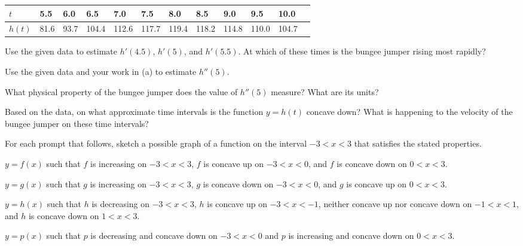\begin{exercises}
\begin{tabular}{| l || l | l | l |  l | l | l | l | l | l | l | l |}
\hline
$t$ & 5.5 & 6.0 & 6.5 & 7.0 & 7.5 & 8.0 & 8.5 & 9.0 & 9.5 & 10.0 \\ \hline \hline
$h(t)$ & 81.6 & 93.7 &  104.4 &  112.6 &  117.7 & 119.4 & 118.2 & 114.8 &  110.0 &  104.7
\\ \hline
\end{tabular}

\ba
	\item Use the given data to estimate $h'(4.5)$, $h'(5)$, and $h'(5.5)$.  At which of these times is the bungee jumper rising most rapidly?
	\item Use the given data and your work in (a) to estimate $h''(5)$.
	\item What physical property of the bungee jumper does the value of $h''(5)$ measure?  What are its units?
	\item Based on the data, on what approximate time intervals is the function $y = h(t)$ concave down?  What is happening to the velocity of the bungee jumper on these time intervals?
\ea

\item For each prompt that follows, sketch a possible graph of a function on the interval $-3 < x < 3$ that satisfies the stated properties.
\ba
	\item $y = f(x)$ such that $f$ is increasing on $-3 < x < 3$, $f$ is concave up on $-3 < x < 0$, and $f$ is concave down on $0 < x < 3$.
	\item $y = g(x)$ such that $g$ is increasing on $-3 < x < 3$, $g$ is concave down on $-3 < x < 0$, and $g$ is concave up on $0 < x < 3$.
	\item $y = h(x)$ such that $h$ is decreasing on $-3 < x < 3$, $h$ is concave up on $-3 < x < -1$, neither concave up nor concave down on $-1 < x < 1$, and $h$ is concave down on $1 < x < 3$.
	\item $y = p(x)$ such that $p$ is decreasing and concave down on $-3 < x < 0$ and $p$ is increasing and concave down on $0 < x < 3$.
\ea

\end{exercises}
\afterexercises